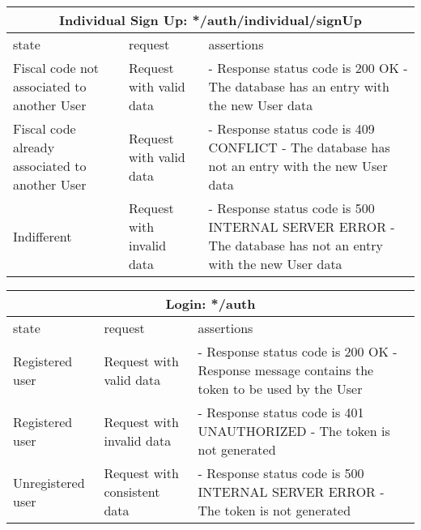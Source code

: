\begin{center}
	\begin{tabular}{|p{}|p{}|p{}|}
		\hline
		\multicolumn{3}{c}{Individual Sign Up: */auth/individual/signUp}\\

		\hline
		state & request & assertions \\
		
		\hline
		Fiscal code not associated to another User &
		Request with valid data & 
		- Response status code is 200 OK\newline
		- The database has an entry with the new User data
		\\
		
		\hline
		Fiscal code already associated to another User   &
		Request with valid data & 
		- Response status code is 409 CONFLICT\newline
		- The database has not an entry with the new User data
		\\
		
		\hline
		Indifferent  &
		Request with invalid data & 
		- Response status code is 500 INTERNAL SERVER ERROR \newline
		- The database has not an entry with the new User data
		\\
		
		\hline

	\end{tabular}
\end{center}

\begin{center}
	\begin{tabular}{|p{}|p{}|p{}|}
		\hline
		\multicolumn{3}{c}{Login: */auth}\\

		\hline
		state & request & assertions \\
		
		\hline
		Registered user&
		Request with valid data & 
		- Response status code is 200 OK\newline
		- Response message contains the token to be used by the User
		\\
		
		\hline
		Registered user&
		Request with invalid data & 
		- Response status code is 401 UNAUTHORIZED \newline
		- The token is not generated
		\\
		
		\hline
		Unregistered user &
		Request with consistent data & 
		- Response status code is 500 INTERNAL SERVER ERROR\newline
		- The token is not generated
		\\
		
		\hline

	\end{tabular}
\end{center}

